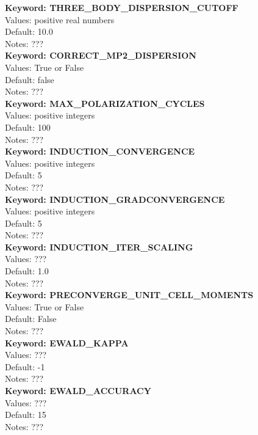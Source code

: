 \documentclass[11pt,letterpaper]{article}
\begin{document}
\begin{spacing}{1.0}
\noindent
\textbf{Keyword: THREE\_BODY\_DISPERSION\_CUTOFF} \\
Values: positive real numbers\\
Default: 10.0\\
Notes:  ???\\

\noindent
\textbf{Keyword: CORRECT\_MP2\_DISPERSION} \\
Values: True or False\\
Default: false\\
Notes:  ???\\


\noindent
\textbf{Keyword: MAX\_POLARIZATION\_CYCLES} \\
Values:  positive integers\\
Default: 100\\
Notes:  ???\\

\noindent
\textbf{Keyword: INDUCTION\_CONVERGENCE} \\
Values:  positive integers\\
Default: 5\\
Notes:  ???\\

\noindent
\textbf{Keyword: INDUCTION\_GRADCONVERGENCE } \\
Values:  positive integers\\
Default: 5\\
Notes:  ???\\

\noindent
\textbf{Keyword: INDUCTION\_ITER\_SCALING} \\
Values:  ???\\
Default: 1.0\\
Notes:  ???\\

\noindent
\textbf{Keyword: PRECONVERGE\_UNIT\_CELL\_MOMENTS} \\
Values:  True or False\\
Default: False\\
Notes:  ???\\

\noindent
\textbf{Keyword: EWALD\_KAPPA} \\
Values:  ???\\
Default: -1\\
Notes:  ???\\

\noindent
\textbf{Keyword: EWALD\_ACCURACY} \\
Values: ???\\
Default: 15\\
Notes:  ???\\


\end{spacing}
\end{document}

